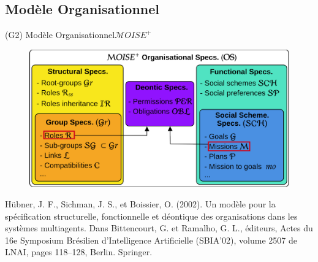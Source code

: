\subsection{Modèle Organisationnel}

\begin{frame}{(G2) Modèle Organisationnel}{$\mathcal{M}OISE^+$}

    \begin{figure}
        \centering
        \includegraphics[width=0.75\linewidth]{figures/moise_model.png}
    \end{figure}

    \begin{spacing}{0.25}
        {\tiny Hübner, J. F., Sichman, J. S., et Boissier, O. (2002).
            Un modèle pour la spécification structurelle, fonctionnelle et déontique
            des organisations dans les systèmes multiagents.
            Dans Bittencourt, G. et Ramalho, G. L., éditeurs, Actes du 16e Symposium Brésilien d'Intelligence Artificielle (SBIA’02), volume 2507 de LNAI, pages 118–128, Berlin. Springer.}
    \end{spacing}

\end{frame}

